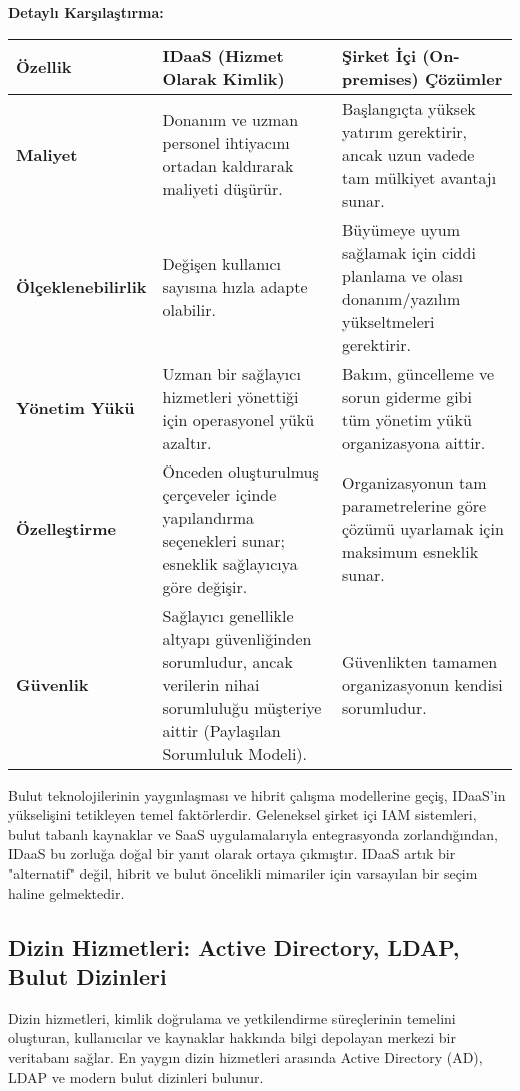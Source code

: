 \textbf{Detaylı Karşılaştırma:}
\begin{tabularx}{\textwidth}{|l|X|X|}
\hline
\textbf{Özellik} & \textbf{IDaaS (Hizmet Olarak Kimlik)} & \textbf{Şirket İçi (On-premises) Çözümler} \\
\hline
\textbf{Maliyet} & Donanım ve uzman personel ihtiyacını ortadan kaldırarak maliyeti düşürür. & Başlangıçta yüksek yatırım gerektirir, ancak uzun vadede tam mülkiyet avantajı sunar. \\
\hline
\textbf{Ölçeklenebilirlik} & Değişen kullanıcı sayısına hızla adapte olabilir. & Büyümeye uyum sağlamak için ciddi planlama ve olası donanım/yazılım yükseltmeleri gerektirir. \\
\hline
\textbf{Yönetim Yükü} & Uzman bir sağlayıcı hizmetleri yönettiği için operasyonel yükü azaltır. & Bakım, güncelleme ve sorun giderme gibi tüm yönetim yükü organizasyona aittir. \\
\hline
\textbf{Özelleştirme} & Önceden oluşturulmuş çerçeveler içinde yapılandırma seçenekleri sunar; esneklik sağlayıcıya göre değişir. & Organizasyonun tam parametrelerine göre çözümü uyarlamak için maksimum esneklik sunar. \\
\hline
\textbf{Güvenlik} & Sağlayıcı genellikle altyapı güvenliğinden sorumludur, ancak verilerin nihai sorumluluğu müşteriye aittir (Paylaşılan Sorumluluk Modeli). & Güvenlikten tamamen organizasyonun kendisi sorumludur. \\
\hline
\end{tabularx}

Bulut teknolojilerinin yaygınlaşması ve hibrit çalışma modellerine geçiş, IDaaS'in yükselişini tetikleyen temel faktörlerdir. Geleneksel şirket içi IAM sistemleri, bulut tabanlı kaynaklar ve SaaS uygulamalarıyla entegrasyonda zorlandığından, IDaaS bu zorluğa doğal bir yanıt olarak ortaya çıkmıştır. IDaaS artık bir "alternatif" değil, hibrit ve bulut öncelikli mimariler için varsayılan bir seçim haline gelmektedir.

\subsection{Dizin Hizmetleri: Active Directory, LDAP, Bulut Dizinleri}

Dizin hizmetleri, kimlik doğrulama ve yetkilendirme süreçlerinin temelini oluşturan, kullanıcılar ve kaynaklar hakkında bilgi depolayan merkezi bir veritabanı sağlar. En yaygın dizin hizmetleri arasında Active Directory (AD), LDAP ve modern bulut dizinleri bulunur.

